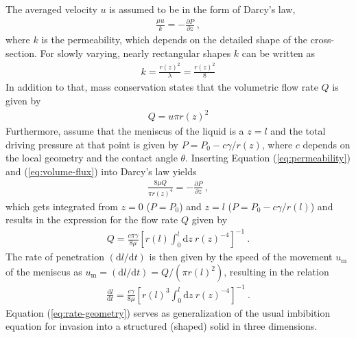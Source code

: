 \documentclass[aip, amsmath, amssymb, reprint, twocolumn, floatfix]{revtex4-1}
\newcommand{\dldt}{\frac{\mathrm{d}l}{\mathrm{d}t}}
\newcommand{\Pt}{P}
\newcommand{\dz}{\mathrm{d}z}
\begin{document}
The averaged velocity $u$ is assumed to be in the form of Darcy's law,
\begin{gather}
	\frac{\mu u}{k} = -\frac{\partial \Pt}{\partial z}~,
	\label{eq:darcy-law}
\end{gather}
where $k$ is the permeability, which depends on the detailed shape of the cross-section. For slowly varying, nearly rectangular shapes $k$ can be written as
\begin{gather}
	k = \frac{r(z)^2}{\lambda} = \frac{r(z)^2}{8}
	\label{eq:permeability}
\end{gather}
In addition to that, mass conservation states that the volumetric flow rate $Q$ is given by
\begin{gather}
	Q = u \pi r(z)^2  
	\label{eq:volume-flux}
\end{gather}
Furthermore, assume that the meniscus of the liquid is a $z = l$ and the total driving pressure at that point is given by $\Pt = P_0 - c \gamma/r(z)$, where $c$ depends on the local geometry and the contact angle $\theta$. Inserting Equation (\ref{eq:permeability}) and (\ref{eq:volume-flux}) into Darcy's law yields
\begin{gather}
	\frac{8 \mu Q}{\pi r(z)^4} = -\frac{\partial \Pt}{\partial z}~,
	\label{eq:darcy-law-flux}
\end{gather}
which gets integrated from $z=0$ ($\Pt = P_0$) and $z = l$ ($\Pt = P_0  - c \gamma/r(l)$) and results in the expression for the flow rate $Q$ given by
\begin{gather}
	Q = \frac{c \pi \gamma}{8\mu} \left[ r(l) \int_0^{l}\!\!\!\dz~r(z)^{-4} \right]^{-1}~.
	\label{eq:volume-flux-integral}
\end{gather}
The rate of penetration $\left(\mathrm{d}l/\mathrm{d}t\right)$ is then given by the speed of the movement $u_\mathrm{m}$ of the meniscus as $u_\mathrm{m} = \left(\mathrm{d}l/\mathrm{d}t\right) = Q / (\pi r(l)^2)$, resulting in the relation
\begin{gather}
	\boxed{\dldt = \frac{c \gamma}{8\mu} \left[ r(l)^3 \int_0^{l}\!\!\!\dz~r(z)^{-4} \right]^{-1}}~.
	\label{eq:rate-geometry}
\end{gather}
Equation (\ref{eq:rate-geometry}) serves as generalization of the usual imbibition equation for invasion into a structured (shaped) solid in three dimensions.
\bigskip
\end{document}
